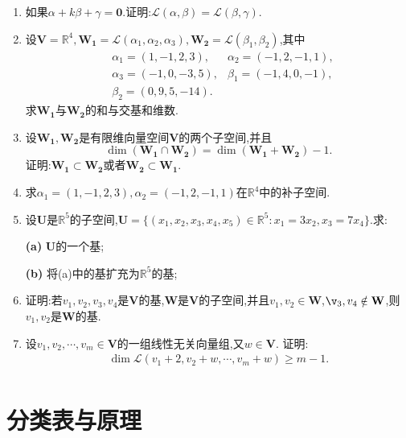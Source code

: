 \documentclass{ctexart}
\begin{document}
\begin{enumerate}
    \vspace*{80pt}

    \item 如果$\alpha+k\beta+\gamma=\mathbf{0}$.证明:$\mathcal{L}(\alpha,\beta)=\mathcal{L}(\beta,\gamma)$.\\
    
    \vspace*{80pt}
    
    \item 设$\mathbf{V}=\mathbb{R}^4,\mathbf{W_1}=\mathcal{L}(\alpha_1,\alpha_2,\alpha_3),\mathbf{W_2}=\mathcal{L}(\beta_1,\beta_2)$,其中
        \begin{align*}
        &\alpha_1=(1,-1,2,3), &\alpha_2=(-1,2,-1,1),\\
        &\alpha_3=(-1,0,-3,5),&\beta_1=(-1,4,0,-1),\\
        &\beta_2=(0,9,5,-14).
        \end{align*}
    求$\mathbf{W_1}$与$\mathbf{W_2}$的和与交基和维数.\\

    \newpage

    \item 设$\mathbf{W_1},\mathbf{W_2}$是有限维向量空间$\mathbf{V}$的两个子空间,并且
    $$
    \dim (\mathbf{W_1}\cap \mathbf{W_2})=\dim (\mathbf{W_1+W_2})-1.
    $$
    证明:$\mathbf{W_1}\subset \mathbf{W_2}$或者$\mathbf{W_2}\subset\mathbf{W_1}$.\\ 

    \vspace*{120pt}

    \item 求$\alpha_1=(1,-1,2,3),\alpha_2=(-1,2,-1,1)$在$\mathbb{R}^4$中的补子空间.\\
    
    \vspace*{80pt}
    
    \item 设$\mathbf{U}$是$\mathbb{R}^5$的子空间,$\mathbf{U}=\{(x_1,x_2,x_3,x_4,x_5)\in \mathbb{R}^5:x_1=3x_2,x_3=7x_4\}$.求:
    
        \textbf{(a)} $\mathbf{U}$的一个基;
        
        \textbf{(b)} 将(a)中的基扩充为$\mathbb{R}^5$的基;\\

    \newpage 

    \item 证明:若$v_1,v_2,v_3,v_4$是$\mathbf{V}$的基,$\mathbf{W}$是$\mathbf{V}$的子空间,并且$v_1,v_2\in\mathbf{W}$,$\v_3,v_4\notin \mathbf{W}$,则$v_1,v_2$是$\mathbf{W}$的基.\\
    
    \vspace*{120pt}
    
    \item 设$v_1,v_2,\cdots,v_m\in \mathbf{V}$的一组线性无关向量组,又$w\in \mathbf{V}$. 证明:
        \begin{align*}
            \dim \mathcal{L}(v_1+2,v_2+w,\cdots,v_m+w)\geq m-1.\\
        \end{align*}


\end{enumerate}

\newpage

\section{分类表与原理}
\end{document}
